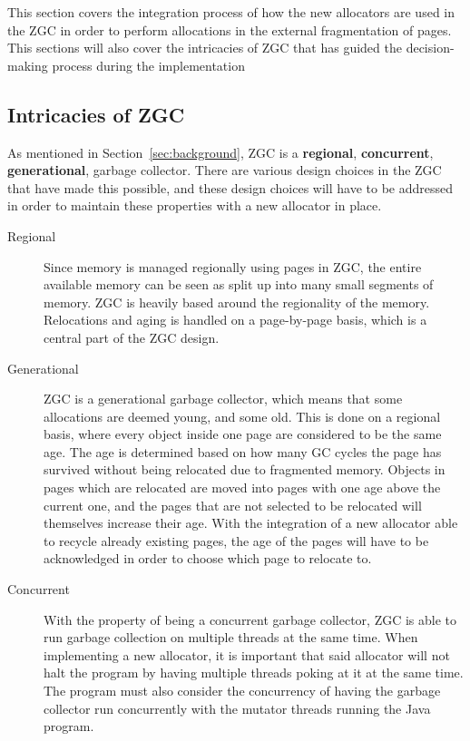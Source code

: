 
This section covers the integration process of how the new allocators are used in the ZGC in order to perform allocations in the external fragmentation of pages. This sections will also cover the intricacies of ZGC that has guided the decision-making process during the implementation
\subsection{Intricacies of ZGC}
As mentioned in Section~\ref*{sec:background}, ZGC is a \textbf{regional}, \textbf{concurrent}, \textbf{generational}, garbage collector. There are various design choices in the ZGC that have made this possible, and these design choices will have to be addressed in order to maintain these properties with a new allocator in place. 
\begin{description}
    \item[Regional] Since memory is managed regionally using pages in ZGC, the entire available memory can be seen as split up into many small segments of memory. ZGC is heavily based around the regionality of the memory. Relocations and aging is handled on a page-by-page basis, which is a central part of the ZGC design.
    \item[Generational] ZGC is a generational garbage collector, which means that some allocations are deemed young, and some old. This is done on a regional basis, where every object inside one page are considered to be the same age. The age is determined based on how many GC cycles the page has survived without being relocated due to fragmented memory. Objects in pages which are relocated are moved into pages with one age above the current one, and the pages that are not selected to be relocated will themselves increase their age. With the integration of a new allocator able to recycle already existing pages, the age of the pages will have to be acknowledged in order to choose which page to relocate to.
    \item[Concurrent] With the property of being a concurrent garbage collector, ZGC is able to run garbage collection on multiple threads at the same time. When implementing a new allocator, it is important that said allocator will not halt the program by having multiple threads poking at it at the same time. The program must also consider the concurrency of having the garbage collector run concurrently with the mutator threads running the Java program.
\end{description}

